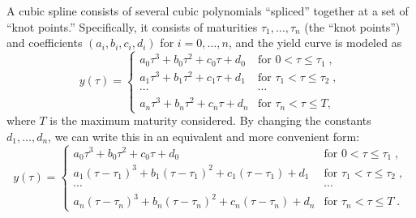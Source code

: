 A cubic spline consists of several cubic polynomials ``spliced'' together at a set of ``knot points.''  Specifically, it consists of maturities $\tau_1,\ldots, \tau_n$ (the ``knot points'') and coefficients $(a_i, b_i, c_i, d_i)$ for $i= 0,\ldots,n$, and the yield curve is modeled as
$$y(\tau) = \begin{cases} a_0 \tau^3 + b_0 \tau^2 + c_0 \tau + d_0 & \text{for $0 < \tau \leq \tau_1\;,$}\\
 a_1 \tau^3 + b_1 \tau^2 + c_1 \tau + d_1 & \text{for $\tau_1 < \tau \leq \tau_2\;,$}\\
\cdots & \cdots \\
a_{n} \tau^3 + b_{n} \tau^2 + c_{n} \tau + d_{n} & \text{for $\tau_n < \tau \leq T$,}\end{cases}
$$
where $T$ is the maximum maturity considered.  By changing the constants $d_1,\ldots,d_n$, we can write this in an equivalent and more convenient form:
\begin{equation}\label{cubicspline00}
y(\tau) = \begin{cases} a_0 \tau^3 + b_0 \tau^2 + c_0 \tau + d_0 & \text{for $0 < \tau \leq \tau_1\;,$}\\
 a_1 (\tau-\tau_1)^3 + b_1 (\tau-\tau_1)^2 + c_1 (\tau-\tau_1)+ d_1 & \text{for $\tau_1 < \tau \leq \tau_2\;,$}\\
\cdots & \cdots \\
a_{n} (\tau-\tau_n)^3 + b_{n} (\tau-\tau_n)^2 + c_{n} (\tau-\tau_n) + d_{n} & \text{for $\tau_n < \tau \leq T\;.$}\end{cases}
\end{equation}

